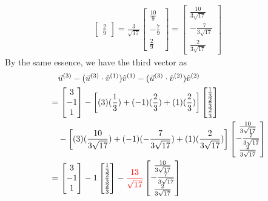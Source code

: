 \begin{solution}
\begin{align*}
\begin{bmatrix}
\frac{2}{9}
\end{bmatrix}
=
\frac{3}{\sqrt{17}}
\begin{bmatrix}
\frac{10}{9} \\
-\frac{7}{9} \\
\frac{2}{9}
\end{bmatrix}
=
\begin{bmatrix}
\frac{10}{3\sqrt{17}} \\
-\frac{7}{3\sqrt{17}}\\
\frac{2}{3\sqrt{17}}
\end{bmatrix}
\end{align*}
By the same essence, we have the third vector as
\begin{align*}
&\quad \vec{u}^{(3)} - (\vec{u}^{(3)} \cdot \hat{v}^{(1)})\hat{v}^{(1)} - (\vec{u}^{(3)} \cdot \hat{v}^{(2)})\hat{v}^{(2)}\\
&=
\begin{bmatrix}
3 \\
-1 \\
1
\end{bmatrix}
-
\left[(3)(\frac{1}{3}) + (-1)(\frac{2}{3}) + (1)(\frac{2}{3})\right]
\begin{bmatrix}
\frac{1}{3} \\
\frac{2}{3} \\
\frac{2}{3}
\end{bmatrix} \\
&\quad -
\left[(3)(\frac{10}{3\sqrt{17}}) + (-1)(-\frac{7}{3\sqrt{17}}) + (1)(\frac{2}{3\sqrt{17}})\right]
\begin{bmatrix}
\frac{10}{3\sqrt{17}} \\
-\frac{7}{3\sqrt{17}} \\
\frac{2}{3\sqrt{17}}
\end{bmatrix} \\
&=
\begin{bmatrix}
3 \\
-1 \\
1
\end{bmatrix}
- 1
\begin{bmatrix}
\frac{1}{3} \\
\frac{2}{3} \\
\frac{2}{3}
\end{bmatrix}
-
\textcolor{red}{\frac{13}{\sqrt{17}}}
\begin{bmatrix}
\frac{10}{3\sqrt{17}} \\
-\frac{7}{3\sqrt{17}} \\
\frac{2}{3\sqrt{17}}
\end{bmatrix}

\end{align*}
\end{solution}
